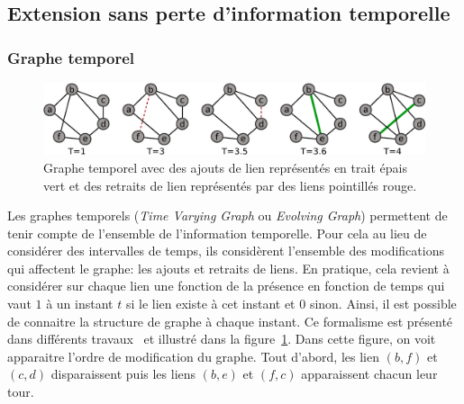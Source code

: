 
\subsection{Extension sans perte d'information temporelle}
\label{subsec:pasperte_info}
\subsubsection{Graphe temporel}
\begin{figure}[h]
\centering
\includegraphics[width=0.9\linewidth]{img/Intro/evolvingGraph.eps}
\caption{Graphe temporel avec des ajouts de lien représentés en trait épais vert et des retraits de lien représentés par des liens pointillés rouge.
}
\label{fig:exemple_evolving}
\end{figure}
Les graphes temporels (\emph{Time Varying Graph} ou \emph{Evolving Graph})
permettent de tenir compte de l'ensemble de l'information temporelle.
Pour cela au lieu de considérer des intervalles de temps, ils considèrent l'ensemble des modifications qui affectent le graphe: les ajouts et retraits de liens.
En pratique, cela revient à considérer sur chaque lien une fonction de la présence en fonction de temps qui vaut $1$ à un instant $t$ si le lien existe à cet instant et $0$ sinon.
Ainsi, il est possible de connaitre la structure de graphe à chaque instant.
Ce formalisme est présenté dans différents travaux~\cite{Casteigts2011,Wehmuth2014} et illustré dans la figure~\ref{fig:exemple_evolving}.
Dans cette figure, on voit apparaitre l'ordre de modification du graphe.
Tout d'abord, les lien $(b,f)$ et $(c,d)$ disparaissent puis les liens $(b,e)$ et $(f,c)$ apparaissent chacun leur tour. 

